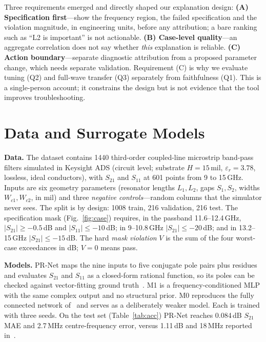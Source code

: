 \documentclass[conference,onecolumn,10pt]{IEEEtran}
\begin{document}
Three requirements emerged and directly shaped our explanation design:
\textbf{(A) Specification first}---show the frequency region, the failed specification and the violation magnitude, in engineering units, before any attribution; a bare ranking such as ``L2 is important'' is not actionable.
\textbf{(B) Case-level quality}---an aggregate correlation does not say whether \emph{this} explanation is reliable.
\textbf{(C) Action boundary}---separate diagnostic attribution from a proposed parameter change, which needs separate validation.
Requirement (C) is why we evaluate tuning (Q2) and full-wave transfer (Q3) separately from faithfulness (Q1).
This is a single-person account; it constrains the design but is not evidence that the tool improves troubleshooting.

\section{Data and Surrogate Models}
\textbf{Data.} The dataset contains 1440 third-order coupled-line microstrip band-pass filters simulated in Keysight ADS (circuit level; substrate $H=15$\,mil, $\varepsilon_r=3.78$, lossless, ideal conductors), with $S_{21}$ and $S_{11}$ at 601 points from 9 to 15\,GHz.
Inputs are six geometry parameters (resonator lengths $L_1,L_2$, gaps $S_1,S_2$, widths $W_{c1},W_{c2}$, in mil) and three \emph{negative controls}---random columns that the simulator never sees.
The split is by design: 1008 train, 216 validation, 216 test.
The specification mask (Fig.~\ref{fig:case}) requires, in the passband 11.6--12.4\,GHz, $|S_{21}|\ge-0.5$\,dB and $|S_{11}|\le-10$\,dB; in 9--10.8\,GHz $|S_{21}|\le-20$\,dB; and in 13.2--15\,GHz $|S_{21}|\le-15$\,dB.
The hard \emph{mask violation} $V$ is the sum of the four worst-case exceedances in dB; $V=0$ means pass.

\textbf{Models.}
PR-Net maps the nine inputs to five conjugate pole pairs plus residues and evaluates $S_{21}$ and $S_{11}$ as a closed-form rational function, so its poles can be checked against vector-fitting ground truth~\cite{gustavsen1999}.
M1 is a frequency-conditioned MLP with the same complex output and no structural prior.
M0 reproduces the fully connected network of~\cite{suslova2026} and serves as a deliberately weaker model.
Each is trained with three seeds.
On the test set (Table~\ref{tab:acc}) PR-Net reaches 0.084\,dB $S_{21}$ MAE and 2.7\,MHz centre-frequency error, versus 1.11\,dB and 18\,MHz reported in~\cite{suslova2026}.
\end{document}
